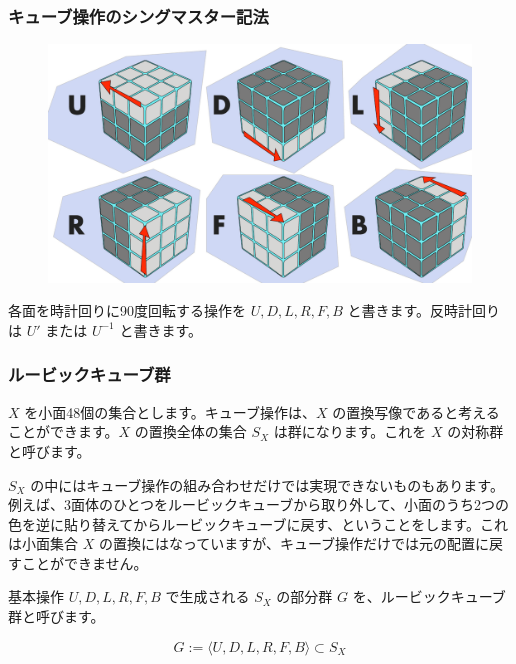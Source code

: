 \documentclass{beamer}
\begin{document}
\begin{frame}
    \frametitle{キューブ操作のシングマスター記法}

    \begin{figure}
        \includegraphics[scale=0.25]{images/singmaster.png}
    \end{figure}

    各面を時計回りに90度回転する操作を \(U, D, L, R, F, B\) と書きます。反時計回りは \(U'\) または \(U^{-1}\) と書きます。
\end{frame}

\begin{frame}
    \frametitle{ルービックキューブ群}

    \(X\) を小面48個の集合とします。キューブ操作は、\(X\) の置換写像であると考えることができます。\(X\) の置換全体の集合 \(S_X\) は群になります。これを \(X\) の対称群と呼びます。

    \bigskip

    \(S_X\) の中にはキューブ操作の組み合わせだけでは実現できないものもあります。例えば、3面体のひとつをルービックキューブから取り外して、小面のうち2つの色を逆に貼り替えてからルービックキューブに戻す、ということをします。これは小面集合 \(X\) の置換にはなっていますが、キューブ操作だけでは元の配置に戻すことができません。

    \bigskip

    基本操作 \(U, D, L, R, F, B\) で生成される \(S_X\) の部分群 \(G\) を、ルービックキューブ群と呼びます。

    \[
        G := \langle U, D, L, R, F, B \rangle \subset S_X
    \]
\end{frame}
\end{document}
